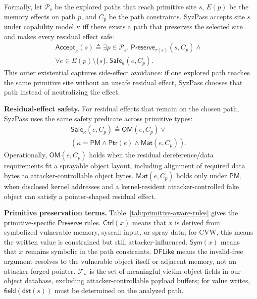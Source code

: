 Formally, let $\mathcal{P}_s$ be the explored paths that reach primitive site $s$, $E(p)$ be the memory effects on path $p$, and $C_p$ be the path constraints. SyzPass accepts site $s$ under capability model $\kappa$ iff there exists a path that preserves the selected site and makes every residual effect safe:
\[
\begin{aligned}
\mathsf{Accept}_{\kappa}(s) \triangleq
\exists p \in \mathcal{P}_s.\;
\mathsf{Preserve}_{\tau(s)}(s,C_p) \land {}\\
\forall e \in E(p)\setminus\{s\}.\ \mathsf{Safe}_{\kappa}(e,C_p).
\end{aligned}
\]
This outer existential captures side-effect avoidance: if one explored path reaches the same primitive site without an unsafe residual effect, SyzPass chooses that path instead of neutralizing the effect.

\noindent\textbf{Residual-effect safety.}
For residual effects that remain on the chosen path, SyzPass uses the same safety predicate across primitive types:
\[
\begin{aligned}
\mathsf{Safe}_{\kappa}(e,C_p) \triangleq
\mathsf{OM}(e,C_p) \lor {}\\
(\kappa=\mathsf{PM} \land \mathsf{Ptr}(e) \land \mathsf{Mat}(e,C_p)).
\end{aligned}
\]
Operationally, $\mathsf{OM}(e,C_p)$ holds when the residual dereference/data requirements fit a sprayable object layout, including alignment of required data bytes to attacker-controllable object bytes. $\mathsf{Mat}(e,C_p)$ holds only under $\mathsf{PM}$, when disclosed kernel addresses and a kernel-resident attacker-controlled fake object can satisfy a pointer-shaped residual effect.

\noindent\textbf{Primitive preservation terms.}
Table~\ref{tab:primitive-aware-rules} gives the primitive-specific $\mathsf{Preserve}$ rules. $\mathsf{Ctrl}(x)$ means that $x$ is derived from symbolized vulnerable memory, syscall input, or spray data; for CVW, this means the written value is constrained but still attacker-influenced. $\mathsf{Sym}(x)$ means that $x$ remains symbolic in the path constraints. $\mathsf{DFLike}$ means the invalid-free argument resolves to the vulnerable object itself or adjacent memory, not an attacker-forged pointer. $\mathcal{F}_{u}$ is the set of meaningful victim-object fields in our object database, excluding attacker-controllable payload buffers; for value writes, $\mathsf{field}(\mathsf{dst}(s))$ must be determined on the analyzed path.


